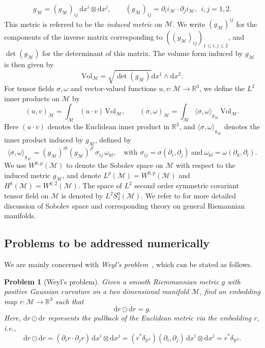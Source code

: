 \documentclass[11pt,a4paper,oneside,reqno]{amsart}
\theoremstyle{definition}
\theoremstyle{plain}
\newtheorem{problem}{Problem}
\numberwithin{theorem}{section}
\numberwithin{proposition}{section}
\numberwithin{lemma}{section}
\numberwithin{equation}{section}
\newcommand{\Man}{\mathcal{M}}
\newcommand{\Vol}{\mathrm{Vol}}
\begin{document}
\[
g_{\Man} = (g_{\Man})_{ij}\,\mathrm{d}x^i \otimes \mathrm{d}x^j,\qquad
(g_{\Man})_{ij} = \partial_i i_{\Man}\cdot \partial_j i_{\Man},\ \ i,j=1,2 .
\]
This metric is referred to be the \emph{induced metric} on \(\Man\). 
We write \((g_{\Man})^{ij}\) for the components of the inverse matrix corresponding to \(((g_{\Man})_{ij})_{1 \leq i,j \leq 2}\), and \(\det(g_{\Man})\) for the determinant of this matrix.
The volume form induced by $g_\Man$ is then given by 
\[ \Vol_{\Man} = \sqrt{\det(g_{\Man})}\mathrm{d}x^1 \wedge \mathrm{d} x^2. \]
For tensor fields $\sigma,\omega$ and vector-valued functions $u,v:\Man\to\mathbb{R}^3$, we define the $L^2$ inner products on $\Man$ by
\begin{equation}\label{eq:inner-Man} 
(u,v)_\Man=\int_{\Man}(u\cdot v)\,\Vol_{\Man},\qquad
(\sigma,\omega)_\Man=\int_{\Man}\langle\sigma,\omega\rangle_{g_\Man}\,\Vol_{\Man}.
\end{equation} 
Here $(u\cdot v)$ denotes the Euclidean inner product in $\mathbb{R}^3$, and $\langle\sigma,\omega\rangle_{g_\Man}$ denotes the inner product induced by $g_\Man$, defined by
\[
\langle\sigma,\omega\rangle_{g_\Man}=(g_\Man)^{ik}(g_\Man)^{jl}\,\sigma_{ij}\,\omega_{kl},
\quad \text{with } \sigma_{ij}=\sigma(\partial_i,\partial_j)\ \text{and}\ \omega_{kl}=\omega(\partial_k,\partial_l).\]
We use $W^{k,p}(\Man)$ to denote the Sobolev space on $\Man$ with respect to the induced metric $g_{\Man}$, and denote $L^p(\Man) = W^{0,p}(\Man)$ and $H^k(\Man) = W^{k,2}(\Man)$. The space of $L^2$ second order symmetric covariant tensor field on $\Man$ is denoted by $L^2S_2^0(\Man)$. We refer to \cite{aubin1998some} for more detailed discussion of Sobolev space and corresponding theory on general Riemannian manifolds.



\subsection{Problems to be addressed numerically}

We are mainly concerned with \emph{Weyl's problem}~\cite{Weyl1916,Heinz1962}, which can be stated as follows. 
\begin{problem}[Weyl's problem]\label{Pro:iso-embd}
Given a smooth Riemmannian metric $g$ with positive Gaussian curvature on a two dimensional manifold $\Man$, find an embedding map $r:\Man\rightarrow \mathbb{R}^3$ such that
\begin{equation}\label{eq:isoemb-RM}
\mathrm{d}r \odot \mathrm{d}r = g.
\end{equation}
Here, \( \mathrm{d}r \odot \mathrm{d}r \) represents the pullback of the Euclidean metric via the embedding \( r \), i.e., 
\[
\mathrm{d}r \odot \mathrm{d}r = (\partial_i r \cdot \partial_j r)\,\mathrm{d}x^i \otimes \mathrm{d}x^j 
= (r^*\delta_{\mathbb{R}^3})(\partial_i, \partial_j)\,\mathrm{d}x^i \otimes \mathrm{d}x^j = r^*\delta_{\mathbb{R}^3} 
.
\]
\end{problem}
\end{document}
